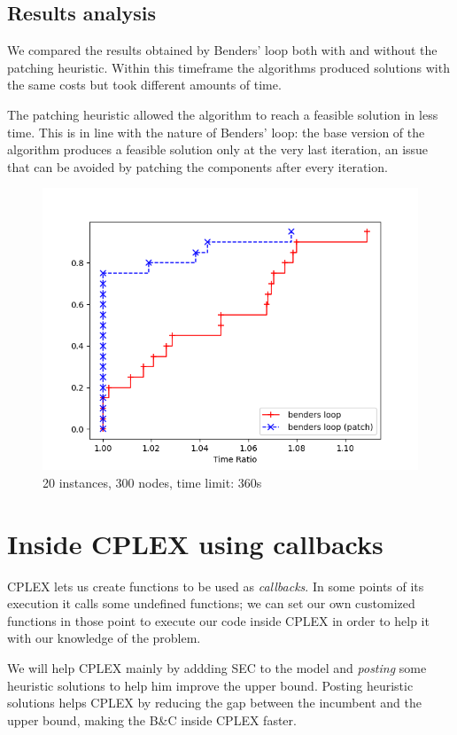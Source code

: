 \subsection{Results analysis}

We compared the results obtained by Benders' loop both with and without the patching heuristic. Within this timeframe the algorithms produced solutions with the same costs but took different amounts of time.

The patching heuristic allowed the algorithm to reach a feasible solution in less time. This is in line with the nature of Benders' loop: the base version of the algorithm produces a feasible solution only at the very last iteration, an issue that can be avoided by patching the components after every iteration.

\FloatBarrier
\begin{figure}[h]
    \centering
    \includegraphics*[width=.6\textwidth]{../plots/perfprof_benders_times.png}
    \caption*{20 instances, 300 nodes, time limit: 360s}
\end{figure}
\FloatBarrier

\section{Inside CPLEX using callbacks}

CPLEX lets us create functions to be used as \textit{callbacks}. In some points of its execution it calls some undefined functions; we can set our own customized functions in those point to execute our code inside CPLEX in order to help it with our knowledge of the problem.

We will help CPLEX mainly by addding SEC to the model and \textit{posting} some heuristic solutions to help him improve the upper bound. Posting heuristic solutions helps CPLEX by reducing the gap between the incumbent and the upper bound, making the B\&C inside CPLEX faster.

